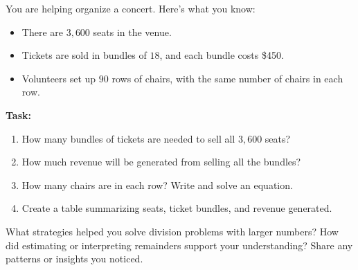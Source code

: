 \documentclass[12pt]{article}
\begin{document}
\begin{tcolorbox}[colframe=black!60, colback=white, 
coltitle=black, colbacktitle=black!15, fonttitle=\bfseries\Large, 
title=Performance Task: Planning a Concert, halign title=center, left=10pt, right=10pt, top=10pt, bottom=50pt]
You are helping organize a concert. Here’s what you know:
\begin{itemize}
    \item There are \( 3,600 \) seats in the venue.
    \item Tickets are sold in bundles of \( 18 \), and each bundle costs \$450.
    \item Volunteers set up \( 90 \) rows of chairs, with the same number of chairs in each row.
\end{itemize}
\textbf{Task:}
\begin{enumerate}[itemsep=4em]
    \item How many bundles of tickets are needed to sell all \( 3,600 \) seats?
    \item How much revenue will be generated from selling all the bundles?
    \item How many chairs are in each row? Write and solve an equation.
    \item Create a table summarizing seats, ticket bundles, and revenue generated.
    \vspace{2cm}
\end{enumerate}
\end{tcolorbox}

\vspace{1em}

\begin{tcolorbox}[colframe=black!60, colback=white, 
coltitle=black, colbacktitle=black!15, fonttitle=\bfseries\Large, 
title=Reflection, halign title=center, left=10pt, right=10pt, top=10pt, bottom=100pt]
What strategies helped you solve division problems with larger numbers? How did estimating or interpreting remainders support your understanding? Share any patterns or insights you noticed.
\end{tcolorbox}
\end{document}
